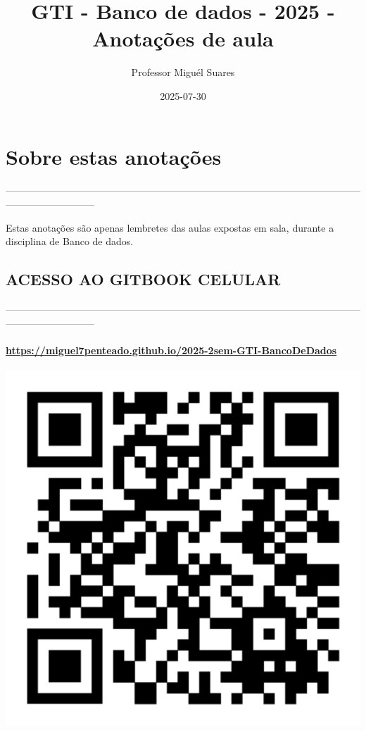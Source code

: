 \documentclass[
]{book}
\title{GTI - Banco de dados - 2025 - Anotações de aula}
\author{Professor Miguél Suares}
\date{2025-07-30}
\theoremstyle{definition}
\theoremstyle{definition}
\theoremstyle{definition}
\theoremstyle{definition}
\theoremstyle{remark}
\begin{document}
\maketitle

{
\setcounter{tocdepth}{1}
\tableofcontents
}
\chapter*{Sobre estas anotações}\label{sobre-estas-anotauxe7uxf5es}

---------------------------------------------------------------------------------------------------------------------------------------

Estas anotações são apenas lembretes das aulas expostas em sala, durante a disciplina de Banco de dados.

\section{ACESSO AO GITBOOK CELULAR}\label{acesso-ao-gitbook-celular}

---------------------------------------------------------------------------------------------------------------------------------------

\subsubsection{\texorpdfstring{\url{https://miguel7penteado.github.io/2025-2sem-GTI-BancoDeDados}}{https://miguel7penteado.github.io/2025-2sem-GTI-BancoDeDados}}\label{httpsmiguel7penteado.github.io2025-2sem-gti-bancodedados}

\includegraphics{images/qr-code-disciplina.jpg}
\end{document}
